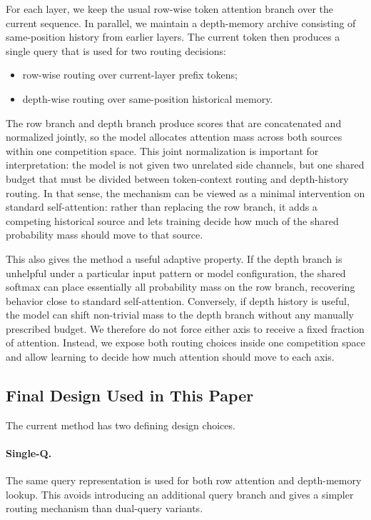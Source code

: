 \documentclass[11pt]{article}
\begin{document}
For each layer, we keep the usual row-wise token attention branch over the current sequence. In parallel, we maintain a depth-memory archive consisting of same-position history from earlier layers. The current token then produces a single query that is used for two routing decisions:
\begin{itemize}[leftmargin=1.5em]
    \item row-wise routing over current-layer prefix tokens;
    \item depth-wise routing over same-position historical memory.
\end{itemize}
The row branch and depth branch produce scores that are concatenated and normalized jointly, so the model allocates attention mass across both sources within one competition space. This joint normalization is important for interpretation: the model is not given two unrelated side channels, but one shared budget that must be divided between token-context routing and depth-history routing. In that sense, the mechanism can be viewed as a minimal intervention on standard self-attention: rather than replacing the row branch, it adds a competing historical source and lets training decide how much of the shared probability mass should move to that source.

This also gives the method a useful adaptive property. If the depth branch is unhelpful under a particular input pattern or model configuration, the shared softmax can place essentially all probability mass on the row branch, recovering behavior close to standard self-attention. Conversely, if depth history is useful, the model can shift non-trivial mass to the depth branch without any manually prescribed budget. We therefore do not force either axis to receive a fixed fraction of attention. Instead, we expose both routing choices inside one competition space and allow learning to decide how much attention should move to each axis.

\subsection{Final Design Used in This Paper}

The current method has two defining design choices.

\paragraph{Single-Q.}
The same query representation is used for both row attention and depth-memory lookup. This avoids introducing an additional query branch and gives a simpler routing mechanism than dual-query variants.
\end{document}
